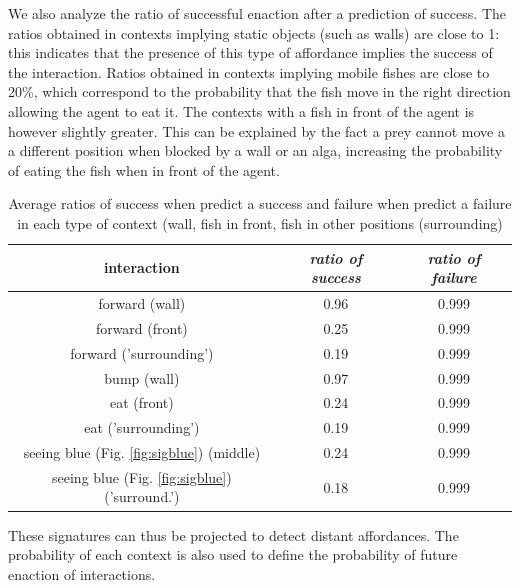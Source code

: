 \documentclass[conference]{IEEEtran}
\begin{document}

We also analyze the ratio of successful enaction after a prediction of success. The ratios obtained in contexts implying static objects (such as walls) are close to 1: this indicates that the presence of this type of affordance implies the success of the interaction. Ratios obtained in contexts implying mobile fishes are close to 20\%, which correspond to the probability that the fish move in the right direction allowing the agent to eat it. The contexts with a fish in front of the agent is however slightly greater. This can be explained by the fact a prey cannot move a a different position when blocked by a wall or an alga, increasing the probability of eating the fish when in front of the agent.


\begin{table}[htbp]
\caption{Average ratios of success when predict a success and failure when predict a failure in each type of context (wall, fish in front, fish in other positions (surrounding)}
\begin{center}
\begin{tabular}{|c|c|c|}
\hline 
\textbf{interaction} & \textbf{\textit{ratio of success}}& \textbf{\textit{ratio of failure}} \\
\hline
forward (wall)& 0.96 &  0.999 \\
\hline
forward (front)& 0.25& 0.999 \\
\hline
forward ('surrounding')& 0.19 & 0.999 \\
\hline
bump (wall)& 0.97 & 0.999 \\
\hline
eat (front)& 0.24 & 0.999 \\
\hline
eat ('surrounding')& 0.19 & 0.999 \\
\hline
seeing blue (Fig. \ref{fig:sigblue}) (middle)& 0.24 & 0.999 \\
\hline
seeing blue (Fig. \ref{fig:sigblue}) ('surround.')& 0.18 & 0.999 \\
\hline
\end{tabular}
\label{tab1}
\end{center}
\end{table}

These signatures can thus be projected to detect distant affordances. The probability of each context is also used to define the probability of future enaction of interactions.
\end{document}
